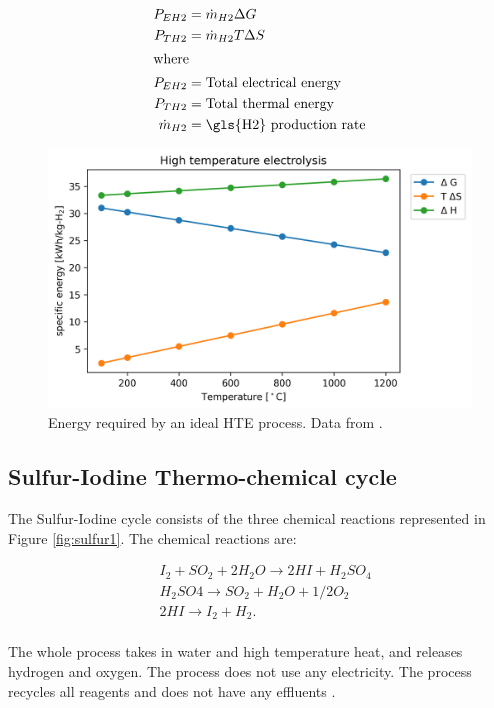 \documentclass[11pt,letterpaper]{article}
\begin{document}
\begin{align}
	P_{EH2} &= \dot{m}_{H2} \Delta G \\
	P_{TH2} &= \dot{m}_{H2} T \Delta S \\
	\label{eq:electrolysis2}
	\intertext{where}
	P_{EH2} &= \mbox{Total electrical energy} \\
	P_{TH2} &= \mbox{Total thermal energy} \\
	\dot{m}_{H2} &= \mbox{\gls{H2} production rate} \\
\end{align}

\begin{figure}[htbp!]
	\centering
	\includegraphics[width=0.7\linewidth]{figures/hte-energy.png}
	\hfill
	\caption{Energy required by an ideal \gls{HTE} process. Data from \cite{yildiz_efficiency_2006}.}
	\label{fig:electro1}
\end{figure}

\subsection{Sulfur-Iodine Thermo-chemical cycle}

The Sulfur-Iodine cycle consists of the three chemical reactions represented in Figure \ref{fig:sulfur1}.
The chemical reactions are:

\begin{align}
	& I_2 + SO_2 + 2H_2O \rightarrow 2HI + H_2SO_4 \\
	\label{eq:sulfur1}
	& H_2SO4 \rightarrow SO_2 + H_2O + 1/2O_2 \\
	\label{eq:sulfur2}
	& 2HI \rightarrow I_2 + H_2. \\
	\label{eq:sulfur3}
\end{align}

The whole process takes in water and high temperature heat, and releases hydrogen and oxygen.
The process does not use any electricity.
The process recycles all reagents and does not have any effluents \cite{yildiz_efficiency_2006}.
\end{document}

